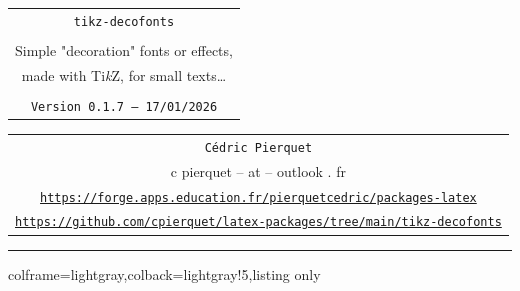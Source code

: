 \documentclass[11pt,a4paper]{ltxdoc}
\def\TPversion{0.1.7}
\def\TPdate{17/01/2026}
\begin{document}
\thispagestyle{empty}

\begin{center}
	\begin{minipage}{0.88\linewidth}
		\begin{tcolorbox}[colframe=yellow,colback=yellow!15]
			\begin{center}
				\renewcommand{\arraystretch}{1.25}%
				\begin{tabular}{c}
					{\Huge \texttt{tikz-decofonts}}\\
					\\
					{\LARGE Simple "decoration" fonts or effects,} \\
					{\LARGE made with Ti\textit{k}Z, for small texts\ldots} \\
					\\
					{\small \texttt{Version \TPversion{} -- \TPdate}}
				\end{tabular}
			\end{center}
		\end{tcolorbox}
	\end{minipage}
\end{center}

\begin{center}
	\begin{tabular}{c}
		\texttt{Cédric Pierquet}\\
		{\ttfamily c pierquet -- at -- outlook . fr}\\
		\texttt{\url{https://forge.apps.education.fr/pierquetcedric/packages-latex}} \\
		\texttt{\url{https://github.com/cpierquet/latex-packages/tree/main/tikz-decofonts}} \\
	\end{tabular}
\end{center}

\hrule

\vfill

\begin{tcblisting}{colframe=lightgray,colback=lightgray!5,listing only}
\end{tcblisting}

\begin{tcolorbox}[colframe=lightgray,colback=lightgray!5]
\end{tcolorbox}
\end{document}
